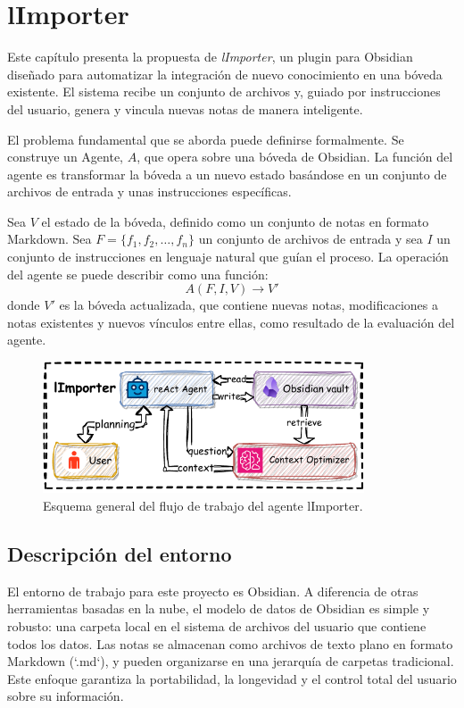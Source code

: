 \chapter{lImporter}\label{chapter:proposal}
Este capítulo presenta la propuesta de \textit{lImporter}, un plugin para Obsidian diseñado para automatizar la integración de nuevo conocimiento en una bóveda existente. El sistema recibe un conjunto de archivos y, guiado por instrucciones del usuario, genera y vincula nuevas notas de manera inteligente.

El problema fundamental que se aborda puede definirse formalmente. Se construye un Agente, $A$, que opera sobre una bóveda de Obsidian. La función del agente es transformar la bóveda a un nuevo estado basándose en un conjunto de archivos de entrada y unas instrucciones específicas.

Sea $V$ el estado de la bóveda, definido como un conjunto de notas en formato Markdown. Sea $F = \{f_1, f_2, \dots, f_n\}$ un conjunto de archivos de entrada y sea $I$ un conjunto de instrucciones en lenguaje natural que guían el proceso. La operación del agente se puede describir como una función:
\[ A(F, I, V) \rightarrow V' \]
donde $V'$ es la bóveda actualizada, que contiene nuevas notas, modificaciones a notas existentes y nuevos vínculos entre ellas, como resultado de la evaluación del agente.

\begin{figure}[h]
    \centering
    \includegraphics[width=0.85\textwidth]{figures/limporter.pdf}
    \caption{Esquema general del flujo de trabajo del agente lImporter.}
    \label{fig:importer_schema}
\end{figure}

\section{Descripción del entorno}
El entorno de trabajo para este proyecto es Obsidian. A diferencia de otras herramientas basadas en la nube, el modelo de datos de Obsidian es simple y robusto: una carpeta local en el sistema de archivos del usuario que contiene todos los datos. Las notas se almacenan como archivos de texto plano en formato Markdown (`.md`), y pueden organizarse en una jerarquía de carpetas tradicional. Este enfoque garantiza la portabilidad, la longevidad y el control total del usuario sobre su información.

